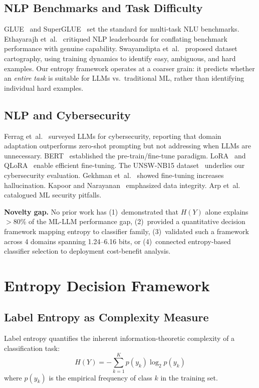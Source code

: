 \documentclass[review,3p]{elsarticle}
\begin{document}
\subsection{NLP Benchmarks and Task Difficulty}
GLUE~\cite{wang2018} and SuperGLUE~\cite{wang2019} set the standard for multi-task NLU benchmarks. Ethayarajh et~al.~\cite{ethayarajh2022} critiqued NLP leaderboards for conflating benchmark performance with genuine capability. Swayamdipta et~al.~\cite{swayamdipta2020} proposed dataset cartography, using training dynamics to identify easy, ambiguous, and hard examples. Our entropy framework operates at a coarser grain: it predicts whether an \emph{entire task} is suitable for LLMs vs.\ traditional ML, rather than identifying individual hard examples.

\subsection{NLP and Cybersecurity}
Ferrag et~al.~\cite{ferrag2024} surveyed LLMs for cybersecurity, reporting that domain adaptation outperforms zero-shot prompting but not addressing when LLMs are unnecessary. BERT~\cite{devlin2019} established the pre-train/fine-tune paradigm. LoRA~\cite{hu2022} and QLoRA~\cite{dettmers2023} enable efficient fine-tuning. The UNSW-NB15 dataset~\cite{moustafa2016} underlies our cybersecurity evaluation. Gekhman et~al.~\cite{gekhman2024} showed fine-tuning increases hallucination. Kapoor and Narayanan~\cite{kapoor2023} emphasized data integrity. Arp et~al.~\cite{arp2022} catalogued ML security pitfalls.

\textbf{Novelty gap.} No prior work has (1)~demonstrated that $H(Y)$ alone explains $>$80\% of the ML-LLM performance gap, (2)~provided a quantitative decision framework mapping entropy to classifier family, (3)~validated such a framework across 4 domains spanning 1.24--6.16 bits, or (4)~connected entropy-based classifier selection to deployment cost-benefit analysis.

\section{Entropy Decision Framework}

\subsection{Label Entropy as Complexity Measure}
Label entropy quantifies the inherent information-theoretic complexity of a classification task:
\begin{equation}
H(Y) = -\sum_{k=1}^{K} p(y_k) \log_2 p(y_k)
\end{equation}
where $p(y_k)$ is the empirical frequency of class $k$ in the training set.
\end{document}
